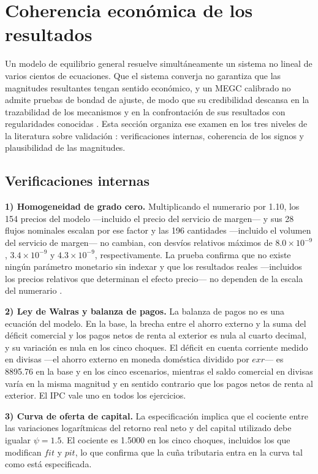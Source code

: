 \documentclass[11pt]{article}
\begin{document}
\section{Coherencia económica de los resultados}
\label{sec:coherencia}

Un modelo de equilibrio general resuelve simultáneamente un sistema no lineal de varios cientos de ecuaciones. Que el sistema converja no garantiza que las magnitudes resultantes tengan sentido económico, y un MEGC calibrado no admite pruebas de bondad de ajuste, de modo que su credibilidad descansa en la trazabilidad de los mecanismos y en la confrontación de sus resultados con regularidades conocidas \cite{kehoe_2005}. Esta sección organiza ese examen en los tres niveles de la literatura sobre validación \cite{dixon_rimmer_2013}: verificaciones internas, coherencia de los signos y plausibilidad de las magnitudes.

\subsection{Verificaciones internas}

\textbf{1) Homogeneidad de grado cero.} Multiplicando el numerario por 1.10, los 154 precios del modelo ---incluido el precio del servicio de margen--- y sus 28 flujos nominales escalan por ese factor y las 196 cantidades ---incluido el volumen del servicio de margen--- no cambian, con desvíos relativos máximos de $8.0\times10^{-9}$, $3.4\times10^{-9}$ y $4.3\times10^{-9}$, respectivamente. La prueba confirma que no existe ningún parámetro monetario sin indexar y que los resultados reales ---incluidos los precios relativos que determinan el efecto precio--- no dependen de la escala del numerario \cite{dewatripont_michel_1987}.

\textbf{2) Ley de Walras y balanza de pagos.} La balanza de pagos no es una ecuación del modelo. En la base, la brecha entre el ahorro externo y la suma del déficit comercial y los pagos netos de renta al exterior es nula al cuarto decimal, y su variación es nula en los cinco choques. El déficit en cuenta corriente medido en divisas ---el ahorro externo en moneda doméstica dividido por $exr$--- es 8895.76 en la base y en los cinco escenarios, mientras el saldo comercial en divisas varía en la misma magnitud y en sentido contrario que los pagos netos de renta al exterior. El IPC vale uno en todos los ejercicios.

\textbf{3) Curva de oferta de capital.} La especificación implica que el cociente entre las variaciones logarítmicas del retorno real neto y del capital utilizado debe igualar $\psi=1.5$. El cociente es 1.5000 en los cinco choques, incluidos los que modifican $fit$ y $pit$, lo que confirma que la cuña tributaria entra en la curva tal como está especificada.
\end{document}
